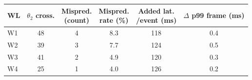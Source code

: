 \begin{tabular}{lccccc}
\toprule
WL & \makecell{$\theta_2$\\cross.} & \makecell{Mispred.\\(count)} & \makecell{Mispred.\\rate (\%)} & \makecell{Added lat.\\/event (ms)} & \makecell{$\Delta$ p99\\frame (ms)} \\
\midrule
W1 & 48 & 4 & 8.3 & 118 & 0.4 \\
W2 & 39 & 3 & 7.7 & 124 & 0.5 \\
W3 & 41 & 2 & 4.9 & 120 & 0.3 \\
W4 & 25 & 1 & 4.0 & 126 & 0.2 \\
\bottomrule
\end{tabular}
